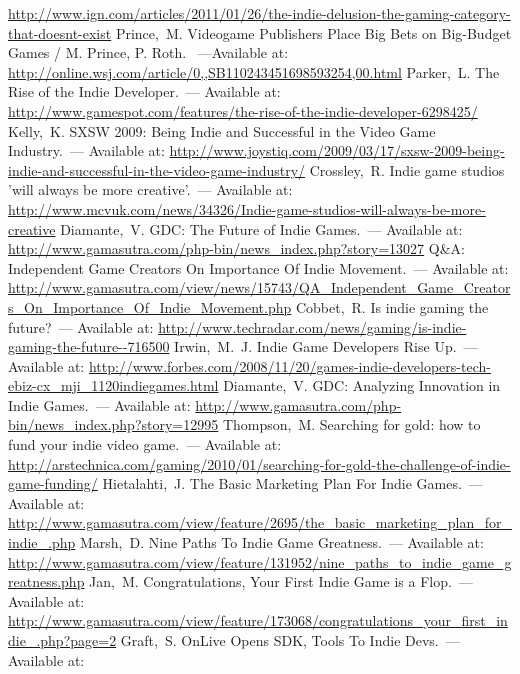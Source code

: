 \begin{thebibliography}{10}
        \url{http://www.ign.com/articles/2011/01/26/the-indie-delusion-the-gaming-category-that-doesnt-exist}
     Prince,~M. Videogame Publishers Place Big Bets on Big-Budget Games / M. Prince, P. Roth.
        ~---Available at: \url{http://online.wsj.com/article/0,,SB110243451698593254,00.html}
     Parker,~L. The Rise of the Indie Developer.~--- Available at: 
        \url{http://www.gamespot.com/features/the-rise-of-the-indie-developer-6298425/}
     Kelly,~K. SXSW 2009: Being Indie and Successful in the Video Game Industry.~--- 
        Available at:
        \url{http://www.joystiq.com/2009/03/17/sxsw-2009-being-indie-and-successful-in-the-video-game-industry/}
     Crossley,~R. Indie game studios 'will always be more creative’.~--- Available at: 
        \url{http://www.mcvuk.com/news/34326/Indie-game-studios-will-always-be-more-creative}
     Diamante,~V. GDC: The Future of Indie Games.~--- Available at: 
        \url{http://www.gamasutra.com/php-bin/news_index.php?story=13027}
     Q\&A: Independent Game Creators On Importance Of Indie Movement.~--- Available at:
        \url{http://www.gamasutra.com/view/news/15743/QA_Independent_Game_Creators_On_Importance_Of_Indie_Movement.php}
     Cobbet,~R. Is indie gaming the future?~--- Available at:
        \url{http://www.techradar.com/news/gaming/is-indie-gaming-the-future--716500}
     Irwin,~M.~J. Indie Game Developers Rise Up.~--- Available at:
        \url{http://www.forbes.com/2008/11/20/games-indie-developers-tech-ebiz-cx_mji_1120indiegames.html}
     Diamante,~V. GDC: Analyzing Innovation in Indie Games.~--- Available at:
        \url{http://www.gamasutra.com/php-bin/news_index.php?story=12995}
     Thompson,~M. Searching for gold: how to fund your indie video game.~--- Available at:
        \url{http://arstechnica.com/gaming/2010/01/searching-for-gold-the-challenge-of-indie-game-funding/}
     Hietalahti,~J. The Basic Marketing Plan For Indie Games.~--- Available at: 
        \url{http://www.gamasutra.com/view/feature/2695/the_basic_marketing_plan_for_indie_.php}
     Marsh,~D. Nine Paths To Indie Game Greatness.~--- Available at: 
        \url{http://www.gamasutra.com/view/feature/131952/nine_paths_to_indie_game_greatness.php}
     Jan,~M. Congratulations, Your First Indie Game is a Flop.~--- Available at:
        \url{http://www.gamasutra.com/view/feature/173068/congratulations_your_first_indie_.php?page=2}
     Graft,~S. OnLive Opens SDK, Tools To Indie Devs.~--- Available at: 

\end{thebibliography}
